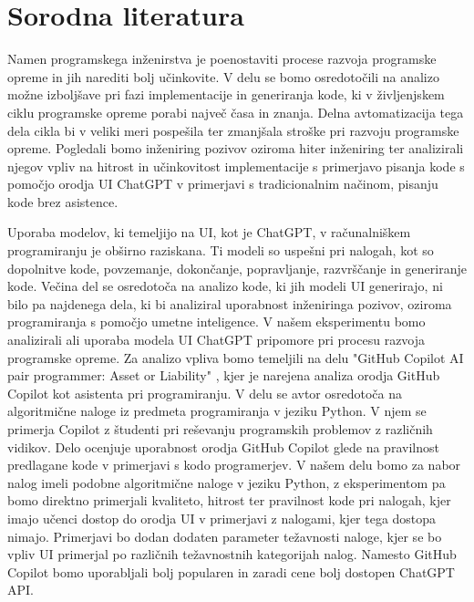 \documentclass[a4paper,12pt,openright]{book}
\begin{document}
\section{Sorodna literatura}

Namen programskega inženirstva je poenostaviti procese razvoja programske opreme in jih narediti bolj učinkovite. 
V delu se bomo osredotočili na analizo možne izboljšave pri fazi implementacije in generiranja kode, ki v življenjskem ciklu programske opreme porabi največ časa in znanja. Delna avtomatizacija tega dela cikla bi v veliki meri pospešila ter zmanjšala stroške pri razvoju programske opreme. Pogledali bomo inženiring pozivov oziroma hiter inženiring ter analizirali njegov vpliv na hitrost in učinkovitost implementacije s primerjavo pisanja kode s pomočjo orodja UI ChatGPT v primerjavi s tradicionalnim načinom, pisanju kode brez asistence. 

Uporaba modelov, ki temeljijo na UI, kot je ChatGPT, v računalniškem programiranju je obširno raziskana. Ti modeli so uspešni pri nalogah, kot so dopolnitve kode, povzemanje, dokončanje, popravljanje, razvrščanje in generiranje kode. Večina del se osredotoča na analizo kode, ki jih modeli UI generirajo, ni bilo pa najdenega dela, ki bi analiziral uporabnost inženiringa pozivov, oziroma programiranja s pomočjo umetne inteligence. V našem eksperimentu bomo analizirali ali uporaba modela UI ChatGPT pripomore pri procesu razvoja programske opreme.
\cite{rudolph2023war}
\newline
Za analizo vpliva bomo temeljili na delu "GitHub Copilot AI pair programmer:
Asset or Liability" \cite{MORADIDAKHEL2023111734}, kjer je narejena analiza orodja GitHub Copilot kot asistenta pri programiranju. V delu se avtor osredotoča na algoritmične naloge iz predmeta programiranja v jeziku Python. V njem se primerja Copilot z študenti pri reševanju programskih problemov z različnih vidikov. Delo ocenjuje uporabnost orodja GitHub Copilot glede na pravilnost predlagane kode v primerjavi s kodo programerjev.
V našem delu bomo za nabor nalog imeli podobne algoritmične naloge v jeziku Python, z eksperimentom pa bomo direktno primerjali kvaliteto, hitrost ter pravilnost kode pri nalogah, kjer imajo učenci dostop do orodja UI v primerjavi z nalogami, kjer tega dostopa nimajo. Primerjavi bo dodan dodaten parameter težavnosti naloge, kjer se bo vpliv UI primerjal po različnih težavnostnih kategorijah nalog. Namesto GitHub Copilot bomo uporabljali bolj popularen in zaradi cene bolj dostopen ChatGPT API. 
\end{document}
